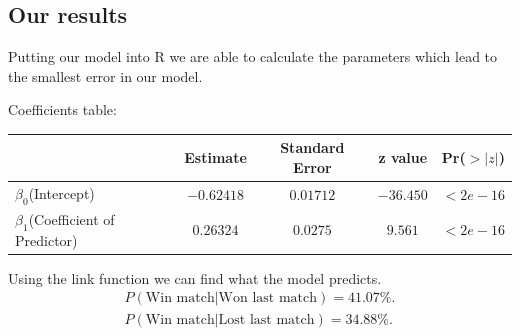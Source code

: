 \documentclass{article}
\begin{document}
\subsection{Our results}
Putting our model into R we are able to calculate the parameters which lead to the smallest error in our model.
\begin{center}
Coefficients table:
\begin{tabular}{lcccc}
\hline
    &Estimate&Standard Error&z value&Pr($>|z|$)\\
\hline
    $\beta_0$(Intercept)&$-0.62418$&$0.01712 $&$-36.450$&$<2e-16$\\ 
    $\beta_1$(Coefficient of Predictor)&$0.26324$&$0.0275$&$9.561$&$<2e-16$\\ 
\hline
\end{tabular}
\end{center}
Using the link function we can find what the model predicts.
\begin{align*}
    P(\text{Win match}|\text{Won last match})=41.07\%.\\
    P(\text{Win match}|\text{Lost last match})=34.88\%.
\end{align*}
\newpage
\end{document}
